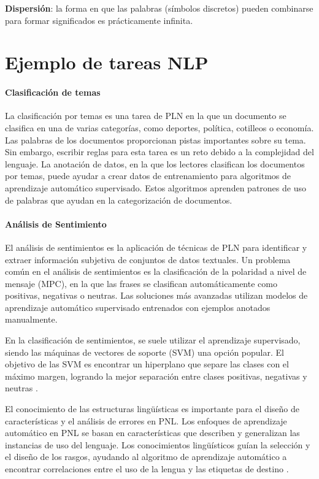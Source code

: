 \documentclass{book}
\begin{document}
\textbf{Dispersión}: la forma en que las palabras (símbolos discretos) pueden combinarse para formar significados es prácticamente infinita.



\section{Ejemplo de tareas NLP}

\paragraph{Clasificación de temas}
La clasificación por temas es una tarea de PLN en la que un documento se clasifica en una de varias categorías, como deportes, política, cotilleos o economía. Las palabras de los documentos proporcionan pistas importantes sobre su tema. Sin embargo, escribir reglas para esta tarea es un reto debido a la complejidad del lenguaje. La anotación de datos, en la que los lectores clasifican los documentos por temas, puede ayudar a crear datos de entrenamiento para algoritmos de aprendizaje automático supervisado. Estos algoritmos aprenden patrones de uso de palabras que ayudan en la categorización de documentos.

\paragraph{Análisis de Sentimiento}
El análisis de sentimientos es la aplicación de técnicas de PLN para identificar y extraer información subjetiva de conjuntos de datos textuales. Un problema común en el análisis de sentimientos es la clasificación de la polaridad a nivel de mensaje (MPC), en la que las frases se clasifican automáticamente como positivas, negativas o neutras. Las soluciones más avanzadas utilizan modelos de aprendizaje automático supervisado entrenados con ejemplos anotados manualmente.

En la clasificación de sentimientos, se suele utilizar el aprendizaje supervisado, siendo las máquinas de vectores de soporte (SVM) una opción popular. El objetivo de las SVM es encontrar un hiperplano que separe las clases con el máximo margen, logrando la mejor separación entre clases positivas, negativas y neutras \cite{jacobbook}.

El conocimiento de las estructuras lingüísticas es importante para el diseño de características y el análisis de errores en PNL. Los enfoques de aprendizaje automático en PNL se basan en características que describen y generalizan las instancias de uso del lenguaje. Los conocimientos lingüísticos guían la selección y el diseño de los rasgos, ayudando al algoritmo de aprendizaje automático a encontrar correlaciones entre el uso de la lengua y las etiquetas de destino \cite{bender2013linguistic}.
\end{document}
